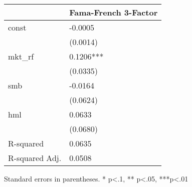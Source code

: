 \begin{table}
\caption{}
\label{}
\begin{center}
\begin{tabular}{ll}
\hline
               & Fama-French 3-Factor  \\
\hline
const          & -0.0005               \\
               & (0.0014)              \\
mkt\_rf        & 0.1206***             \\
               & (0.0335)              \\
smb            & -0.0164               \\
               & (0.0624)              \\
hml            & 0.0633                \\
               & (0.0680)              \\
R-squared      & 0.0635                \\
R-squared Adj. & 0.0508                \\
\hline
\end{tabular}
\end{center}
\end{table}
\bigskip
Standard errors in parentheses. \newline 
* p<.1, ** p<.05, ***p<.01